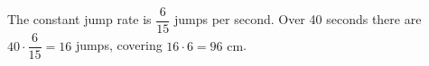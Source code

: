 The constant jump rate is $\dfrac{6}{15}$ jumps per second. Over 40 seconds there are $40\cdot\dfrac{6}{15}=16$ jumps, covering $16\cdot6=\boxed{96\text{ cm}}$.
